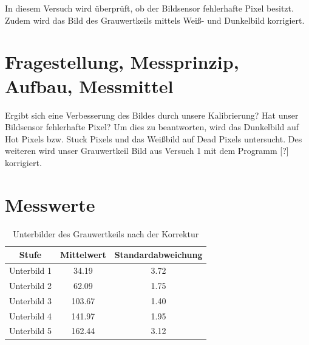 \documentclass[12pt,oneside,a4paper]{report}
\begin{document}
In diesem Versuch wird überprüft, ob der Bildsensor fehlerhafte Pixel besitzt.
Zudem wird das Bild des Grauwertkeils mittels Weiß- und Dunkelbild korrigiert.

\section{Fragestellung, Messprinzip, Aufbau, Messmittel}
\label{chap:VERSUCH_4_FRAGESTELLUNG}

Ergibt sich eine Verbesserung des Bildes durch unsere Kalibrierung? Hat unser Bildsensor fehlerhafte Pixel? Um dies zu beantworten, wird das Dunkelbild auf Hot Pixels bzw. Stuck Pixels und das Weißbild auf Dead Pixels untersucht.
Des weiteren wird unser Grauwertkeil Bild aus Versuch 1 mit dem Programm [?] korrigiert.

\section{Messwerte}
\label{chap:VERSUCH_4_MESSWERTE}

\begin{table}[H]
\centering 
\begin{tabular}{ccc}
\hline
\textbf{Stufe} &\textbf{ Mittelwert} & \textbf{Standardabweichung} \\
\hline
Unterbild 1 & 34.19 & 3.72 \\
\hline
Unterbild 2 & 62.09 & 1.75 \\
\hline
Unterbild 3 & 103.67 & 1.40 \\
\hline
Unterbild 4 & 141.97 & 1.95 \\
\hline
Unterbild 5 & 162.44 & 3.12 \\
\hline
\end{tabular} 
\caption{Unterbilder des Grauwertkeils nach der Korrektur}
\label{tab:UNTERBILDER_KOR}
\end{table}
\end{document}
